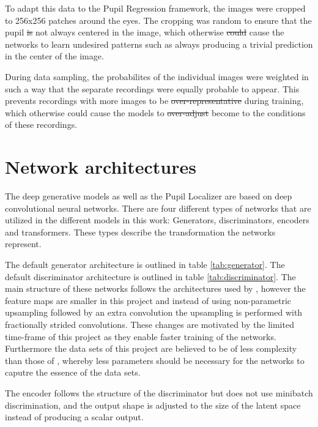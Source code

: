 To adapt this data to the Pupil Regression framework, the images were cropped to 256x256 patches around the eyes. The cropping was random to ensure that the pupil \st{is}  not always centered in the image, which otherwise \st{could}  cause the networks to learn undesired patterns such as always producing a trivial prediction in the center of the image. 

During data sampling, the probabilites of the individual images were weighted in such a way that the separate recordings were equally probable to appear. This prevents recordings with more images to be \st{over-representative}  during training, which otherwise could cause the models to \st{over-adjust} become  to the conditions of these recordings.

\section{Network architectures}
The deep generative models as well as the Pupil Localizer are based on deep convolutional neural networks. There are four different types of networks that are utilized in the different models in this work: Generators, discriminators, encoders and transformers. These types describe the transformation  the networks represent.

The default generator architecture is outlined in table \ref{tab:generator}. The default discriminator architecture is outlined in table \ref{tab:discriminator}. The main structure of these networks follows the architectures used by \textcite{karras2017progressive}, however the feature maps are smaller in this project and instead of using non-parametric upsampling followed by an extra convolution \todoproofread{,} the upsampling is performed with fractionally strided convolutions. These changes are motivated by the limited time-frame of this project as they enable faster training of the networks. Furthermore \todoproofread{,} the data sets of this project are believed to be of less complexity than those of \textcite{karras2017progressive}, whereby less parameters should be necessary for the networks to caputre the essence of the data sets.

The encoder follows the structure of the discriminator but does not use minibatch discrimination, and the output shape is adjusted to the size of the latent space instead of producing a scalar output. 

